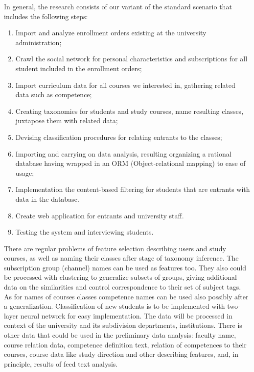 \documentclass[conference,a4]{IEEEtran}
\begin{document}
In general, the research consists of our variant of the standard scenario that includes the following steps:
\begin{enumerate}
\item Import and analyze enrollment orders existing at the university administration;
\item Crawl the social network for personal characteristics and subscriptions for all student included in the enrollment orders;
\item Import curriculum data for all courses we interested in, gathering related data such as competence;
\item Creating taxonomies for students and study courses, name resulting classes, juxtapose them with related data;
\item Devising classification procedures for relating entrants to the classes;
\item Importing and carrying on data analysis, resulting organizing a rational database having wrapped in an ORM (Object-relational mapping) to ease of usage;
\item Implementation the content-based filtering for students that are entrants with data in the database.
\item Create web application for entrants and university staff.
\item Testing the system and interviewing students.
\end{enumerate}

There are regular problems of feature selection describing users and study courses, as well as naming their classes after stage of taxonomy inference.  The subscription group (channel) names can be used as features too.  They also could be processed with clustering to generalize subsets of groups, giving additional data on the similarities and control correspondence to their set of subject tags.  As for names of courses classes competence names can be used also possibly after a generalization.  Classification of new students is to be implemented with two-layer neural network for easy implementation. The data will be processed in context of the university and its subdivision departments, institutions.  There is other data that could be used in the preliminary data analysis: faculty name, course relation data, competence definition text, relation of competences to their courses, course data like study direction and other describing features, and, in principle, results of feed text analysis.
\end{document}
